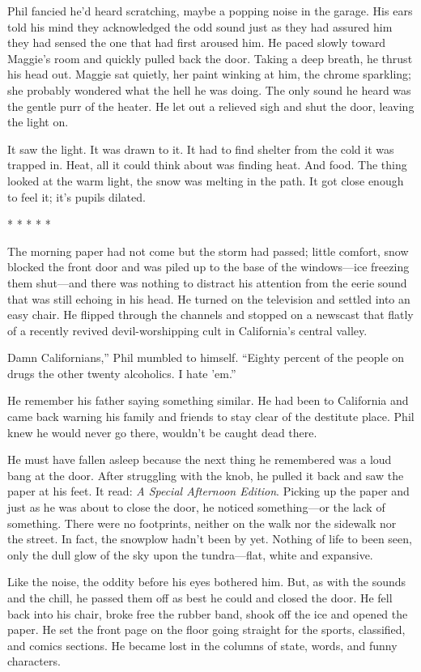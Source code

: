 \documentclass[
]{article}
\begin{document}
Phil fancied he'd heard scratching, maybe a popping noise in the garage.
His ears told his mind they acknowledged the odd sound just as they had
assured him they had sensed the one that had first aroused him. He paced
slowly toward Maggie's room and quickly pulled back the door. Taking a
deep breath, he thrust his head out. Maggie sat quietly, her paint
winking at him, the chrome sparkling; she probably wondered what the
hell he was doing. The only sound he heard was the gentle purr of the
heater. He let out a relieved sigh and shut the door, leaving the light
on.

It saw the light. It was drawn to it. It had to find shelter from the
cold it was trapped in. Heat, all it could think about was finding heat.
And food. The thing looked at the warm light, the snow was melting in
the path. It got close enough to feel it; it's pupils dilated.

* * * * *

The morning paper had not come but the storm had passed; little comfort,
snow blocked the front door and was piled up to the base of the
windows---ice freezing them shut---and there was nothing to distract his
attention from the eerie sound that was still echoing in his head. He
turned on the television and settled into an easy chair. He flipped
through the channels and stopped on a newscast that flatly of a recently
revived devil-worshipping cult in California's central valley.

Damn Californians,'' Phil mumbled to himself. ``Eighty percent of the
people on drugs the other twenty alcoholics. I hate 'em.''

He remember his father saying something similar. He had been to
California and came back warning his family and friends to stay clear of
the destitute place. Phil knew he would never go there, wouldn't be
caught dead there.

He must have fallen asleep because the next thing he remembered was a
loud bang at the door. After struggling with the knob, he pulled it back
and saw the paper at his feet. It read: \emph{A Special Afternoon
Edition}. Picking up the paper and just as he was about to close the
door, he noticed something---or the lack of something. There were no
footprints, neither on the walk nor the sidewalk nor the street. In
fact, the snowplow hadn't been by yet. Nothing of life to been seen,
only the dull glow of the sky upon the tundra---flat, white and
expansive.

Like the noise, the oddity before his eyes bothered him. But, as with
the sounds and the chill, he passed them off as best he could and closed
the door. He fell back into his chair, broke free the rubber band, shook
off the ice and opened the paper. He set the front page on the floor
going straight for the sports, classified, and comics sections. He
became lost in the columns of state, words, and funny characters.
\end{document}
